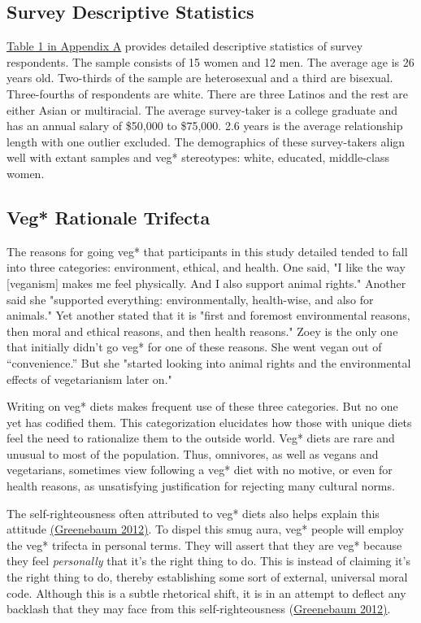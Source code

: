 \documentclass[twoside]{report}
\begin{document}
\begin{multicols*}{2}
\subsection{Survey Descriptive Statistics}

\hyperlink{appendix-a}{Table 1 in Appendix A} provides detailed descriptive statistics of survey respondents. The sample consists of 15 women and 12 men. The average age is 26 years old. Two-thirds of the sample are heterosexual and a third are bisexual. Three-fourths of respondents are white. There are three
Latinos and the rest are either Asian or multiracial. The average
survey-taker is a college graduate and has an annual salary of \$50,000
to \$75,000. 2.6 years is the average relationship length with
one outlier excluded. The demographics of these survey-takers align
well with extant samples and veg* stereotypes: white, educated,
middle-class women.

\subsection{Veg* Rationale Trifecta}

The reasons for going veg* that participants in this study detailed tended to fall into three categories: environment, ethical, and health. One said, "I like the way {[}veganism{]} makes me feel physically. And I also support animal rights." Another said she "supported everything: environmentally, health-wise, and also for animals." Yet another stated that it is "first and foremost environmental reasons, then moral and ethical reasons, and then health reasons." Zoey is the only one that initially didn't go veg* for one of
these reasons. She went vegan out of ``convenience.'' But she "started
looking into animal rights and the environmental effects of vegetarianism later on."

Writing on veg* diets makes frequent use of these three categories. But
no one yet has codified them. This categorization elucidates how those with unique diets feel the need to rationalize them to the outside world. Veg*
diets are rare and unusual to most of the population. Thus, omnivores, as well as vegans and vegetarians, sometimes view following a veg* diet with no motive, or even for health reasons, as unsatisfying justification for rejecting many cultural norms.

The self-righteousness often attributed to veg* diets also helps explain
this attitude \hyperlink{greenebaum}{(Greenebaum 2012)}. To dispel this smug aura, veg* people will employ the veg* trifecta in personal terms. They will assert that they are veg* because they feel \emph{personally} that it's the right thing to do. This is instead of claiming it's the right thing to do, thereby
establishing some sort of external, universal moral code. Although this
is a subtle rhetorical shift, it is in an attempt to deflect any
backlash that they may face from this self-righteousness (\hyperlink{greenebaum}{Greenebaum 2012)}.


\end{multicols*}
\end{document}
